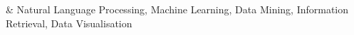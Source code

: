 %
\color{OliveGreen}{Research interests}
& Natural Language Processing, Machine Learning, Data Mining, Information Retrieval, Data Visualisation \\